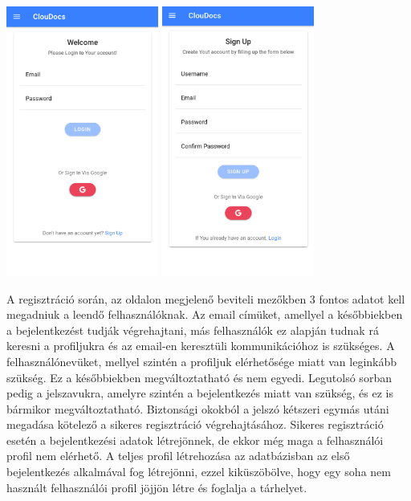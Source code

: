 \documentclass[12pt]{report}
\begin{document}
\begin{center}
	\includegraphics[width=50mm,scale=0.5,]{login.png}
	\includegraphics[width=50mm,scale=0.5,]{registration.png}
\end{center}

A regisztráció során, az oldalon megjelenő beviteli mezőkben 3 fontos adatot kell megadniuk a leendő felhasználóknak. Az email címüket, amellyel a későbbiekben a bejelentkezést tudják végrehajtani, más felhasználók ez alapján tudnak rá keresni a profiljukra és az email-en keresztüli kommunikációhoz is szükséges. A felhasználónevüket, mellyel szintén a profiljuk elérhetősége miatt van leginkább szükség. Ez a későbbiekben megváltoztatható és nem egyedi. Legutolsó sorban pedig a jelszavukra, amelyre szintén a bejelentkezés miatt van szükség, és ez is bármikor megváltoztatható. Biztonsági okokból a jelszó kétszeri egymás utáni megadása kötelező a sikeres regisztráció végrehajtásához. Sikeres regisztráció esetén a bejelentkezési adatok létrejönnek, de ekkor még maga a felhasználói profil nem elérhető. A teljes profil létrehozása az adatbázisban az első bejelentkezés alkalmával fog létrejönni, ezzel kiküszöbölve, hogy egy soha nem használt felhasználói profil jöjjön létre és foglalja a tárhelyet.
\end{document}
